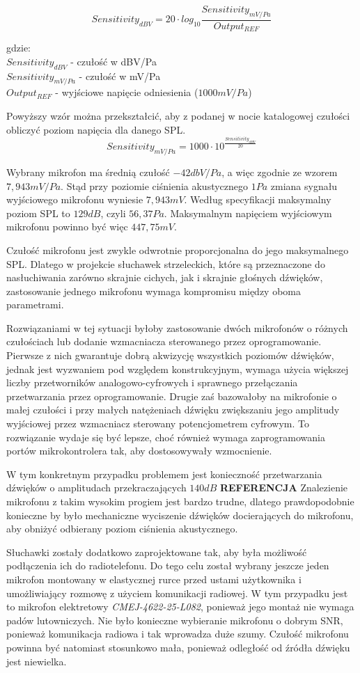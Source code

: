 \begin{equation}
    Sensitivity_{dBV} = 20 \cdot log_{10}\frac{Sensitivity_{mV/Pa}}{Output_{REF}}
\end{equation}

gdzie: \\
\indent$Sensitivity_{dBV}$ - czułość w dBV/Pa \\
\indent$Sensitivity_{mV/Pa}$ - czułość w mV/Pa \\
\indent$Output_{REF}$ - wyjściowe napięcie odniesienia ($1000mV/Pa$) 

Powyższy wzór można przekształcić, aby z podanej w nocie katalogowej czułości obliczyć poziom napięcia dla danego SPL.
\begin{equation}
    Sensitivity_{mV/Pa} = 1000 \cdot 10^{\frac{Sensitivity_{dBV}}{20}}
\end{equation}

Wybrany mikrofon ma średnią czułość $-42 dbV/Pa$, a więc zgodnie ze wzorem $7,943 mV/Pa$. Stąd przy poziomie ciśnienia akustycznego $1Pa$ zmiana sygnału wyjściowego mikrofonu wyniesie $7,943 mV$. Według specyfikacji maksymalny poziom SPL to $129 dB$, czyli $56,37 Pa$. Maksymalnym napięciem wyjściowym mikrofonu powinno być więc $447,75 mV$.

Czułość mikrofonu jest zwykle odwrotnie proporcjonalna do jego maksymalnego SPL. Dlatego w projekcie słuchawek strzeleckich, które są przeznaczone do nasłuchiwania zarówno skrajnie cichych, jak i skrajnie głośnych dźwięków, zastosowanie jednego mikrofonu wymaga kompromisu między oboma parametrami. 

Rozwiązaniami w tej sytuacji byłoby zastosowanie dwóch mikrofonów o różnych czułościach lub dodanie wzmacniacza sterowanego przez oprogramowanie. Pierwsze z nich gwarantuje dobrą akwizycję wszystkich poziomów dźwięków, jednak jest wyzwaniem pod względem konstrukcyjnym, wymaga użycia większej liczby przetworników analogowo-cyfrowych i sprawnego przełączania przetwarzania przez oprogramowanie. Drugie zaś bazowałoby na mikrofonie o małej czułości i przy małych natężeniach dźwięku zwiększaniu jego amplitudy wyjściowej przez wzmacniacz sterowany potencjometrem cyfrowym. To rozwiązanie wydaje się być lepsze, choć również wymaga zaprogramowania portów mikrokontrolera tak, aby dostosowywały wzmocnienie.

W tym konkretnym przypadku problemem jest konieczność przetwarzania dźwięków o amplitudach przekraczających $140dB$
\textbf{REFERENCJA}
Znalezienie mikrofonu z takim wysokim progiem jest bardzo trudne, dlatego prawdopodobnie konieczne by było mechaniczne wyciszenie dźwięków docierających do mikrofonu, aby obniżyć odbierany poziom ciśnienia akustycznego.

Słuchawki zostały dodatkowo zaprojektowane tak, aby była możliwość podłączenia ich do radiotelefonu. Do tego celu został wybrany jeszcze jeden mikrofon montowany w elastycznej rurce przed ustami użytkownika i umożliwiający rozmowę z użyciem komunikacji radiowej. W tym przypadku jest to mikrofon elektretowy \textit{CMEJ-4622-25-L082}, ponieważ jego montaż nie wymaga padów lutowniczych. Nie było konieczne wybieranie mikrofonu o dobrym SNR, ponieważ komunikacja radiowa i tak wprowadza duże szumy. Czułość mikrofonu powinna być natomiast stosunkowo mała, ponieważ odległość od źródła dźwięku jest niewielka.